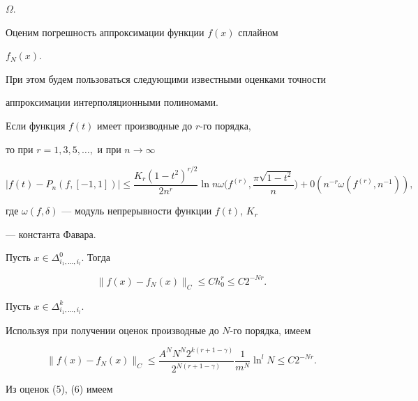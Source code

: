 $\Omega.$


Оценим погрешность аппроксимации функции $ f(x) $ сплайном


$f_N(x).$


При этом будем пользоваться следующими известными оценками точности


аппроксимации интерполяционными полиномами.








\begin{lems}[\myfont{[8], с.\,273}]


Если функция $ f(t) $ имеет производные до $r$-го порядка,


то при $r=1,3,5,\dotsc,$ и при $n\to \infty$


$$


| f(t)-P_n(f,[-1,1])| \le


\frac{K_r(1-t^2)^{r/2}}{2n^r} \ln n


\omega\bigg(f^{(r)},\frac{\pi\sqrt{1-t^2}}{n}\bigg)+


0(n^{-r}\omega(f^{(r)},n^{-1})),


$$


где $\omega(f,\delta)$ --- модуль непрерывности функции $f(t)$, $K_r$


--- константа Фавара.


\end{lems}





Пусть $x\in \Delta^0_{i_1,\dotsc,i_l}.$ Тогда


\begin {equation}


\| f(x)-f_N(x)\|_C \le Ch_0^r\le C2^{-Nr}.


\end {equation}


Пусть $ x\in \Delta^k_{i_1,\dotsc,i_l}.$


Используя при получении оценок производные до $N$-го порядка, имеем


\begin {equation}


\| f(x)-f_N(x)\|_C \le


\frac{A^N N^ N 2^{k(r+1-\gamma )}}{2^{N(r+1-\gamma )}}


\frac{1}{m^N}\ln^lN \le C2^{-Nr}.


\end {equation}


Из оценок (5), (6) имеем


